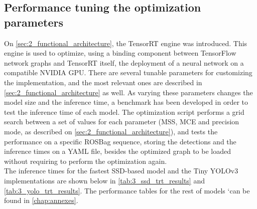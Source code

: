 \subsection{Performance tuning the optimization parameters}

\label{sec:3_grid_trt}
On \autoref{sec:2_functional_architecture}, the TensorRT engine was introduced. This engine is used to optimize, using a binding component between TensorFlow network graphs and TensorRT itself, the deployment of a neural network on a compatible NVIDIA GPU. There are several tunable parameters for customizing the implementation, and the most relevant ones are described in \autoref{sec:2_functional_architecture} as well. As varying these parameters changes the model size and the inference time, a benchmark has been developed in order to test the inference time of each model. The optimization script performs a grid search between a set of values for each parameter (MSS, MCE and precision mode, as described on \autoref{sec:2_functional_architecture}), and tests the performance on a specific ROSBag sequence, storing the detections and the inference times on a YAML file, besides the optimized graph to be loaded without requiring to perform the optimization again.\\

The inference times for the fastest SSD-based model and the Tiny YOLOv3 implementations are shown below in \autoref{tab:3_ssd_trt_results} and \autoref{tab:3_yolo_trt_results}. The performance tables for the rest of models `can be found in \autoref{chap:annexes}.


